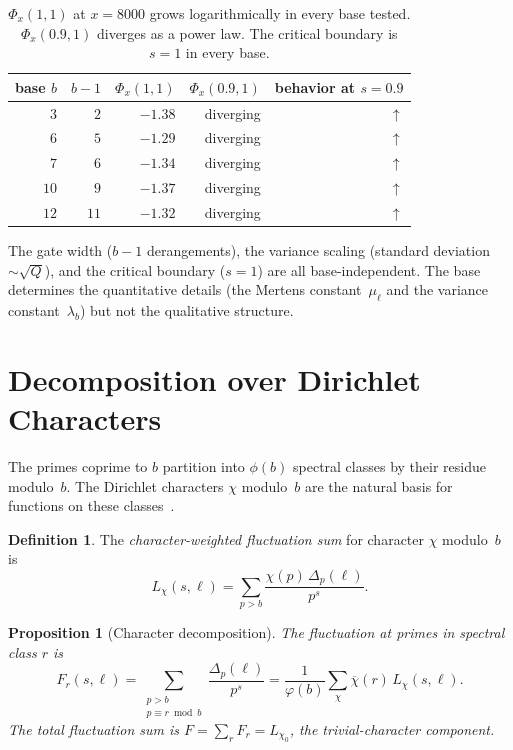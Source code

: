 \documentclass[12pt]{amsart}
\newtheorem{proposition}[theorem]{Proposition}
\theoremstyle{definition}
\newtheorem{definition}[theorem]{Definition}
\theoremstyle{remark}
\begin{document}
\begin{table}[h]
\centering
\begin{tabular}{rrrrr}
\toprule
base $b$ & $b - 1$ & $\Phi_x(1, 1)$ & $\Phi_x(0.9, 1)$ & behavior
  at $s = 0.9$ \\
\midrule
$3$ & $2$ & $-1.38$ & diverging & $\uparrow$ \\
$6$ & $5$ & $-1.29$ & diverging & $\uparrow$ \\
$7$ & $6$ & $-1.34$ & diverging & $\uparrow$ \\
$10$ & $9$ & $-1.37$ & diverging & $\uparrow$ \\
$12$ & $11$ & $-1.32$ & diverging & $\uparrow$ \\
\bottomrule
\end{tabular}
\caption{$\Phi_x(1,1)$ at $x = 8000$ grows logarithmically in every base tested.
$\Phi_x(0.9, 1)$ diverges as a power law. The critical boundary is
$s = 1$ in every base.}
\label{tab:bases}
\end{table}

The gate width ($b - 1$ derangements), the variance scaling
(standard deviation $\sim \sqrt{Q}$), and the critical boundary ($s = 1$)
are all base-independent. The base determines the quantitative
details (the Mertens constant~$\mu_{\ell}$ and the variance
constant~$\lambda_b$) but not the qualitative structure.

\section{Decomposition over Dirichlet Characters}

The primes coprime to $b$ partition into $\phi(b)$ spectral
classes by their residue modulo~$b$. The Dirichlet characters
$\chi$ modulo~$b$ are the natural basis for functions on these
classes~\cite{davenport,iwaniec}.

\begin{definition}
The \emph{character-weighted fluctuation sum} for character
$\chi$ modulo~$b$ is
\[
L_{\chi}(s, \ell) = \sum_{p > b}
\frac{\chi(p)\, \Delta_p(\ell)}{p^s}.
\]
\end{definition}

\begin{proposition}[Character decomposition]
\label{prop:decomposition}
The fluctuation at primes in spectral class $r$ is
\[
F_r(s, \ell) = \sum_{\substack{p > b \\ p \equiv r \bmod b}}
\frac{\Delta_p(\ell)}{p^s}
= \frac{1}{\varphi(b)} \sum_{\chi}
\overline{\chi}(r)\, L_{\chi}(s, \ell).
\]
The total fluctuation sum is
$F = \sum_r F_r = L_{\chi_0}$, the trivial-character component.
\end{proposition}
\end{document}
